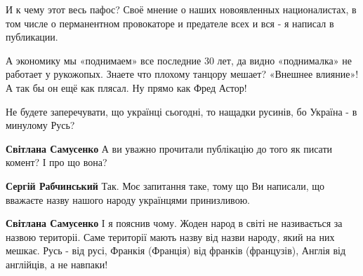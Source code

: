 \begin{itemize}
\begin{itemize}
И к чему этот весь пафос? Своё мнение о наших новоявленных националистах, в том
числе о перманентном провокаторе и предателе всех и вся - я написал в
публикации.

А экономику мы «поднимаем» все последние 30 лет, да видно «поднималка» не
работает у рукожопых. Знаете что плохому танцору мешает? «Внешнее влияние»! А
так бы он ещё как плясал. Ну прямо как Фред Астор!

\end{itemize}

 

Не будете заперечувати, що українці сьогодні, то нащадки русинів, бо Україна -
в минулому Русь?

\begin{itemize}
 
\textbf{Світлана Самусенко} А ви уважно прочитали публікацію до того як писати комент? І про що вона?

 
\textbf{Сергій Рабчинський} Так. Моє запитання таке, тому що Ви написали, що вважаєте назву нашого народу українцями принизливою.

 
\textbf{Світлана Самусенко} І я пояснив чому. Жоден народ в світі не
називається за назвою територіі. Саме території мають назву від назви народу,
який на них мешкає. Русь - від русі, Франкія (Франція) від франків (французів),
Англія від англійців, а не навпаки!

 

\end{itemize}
\end{itemize}
